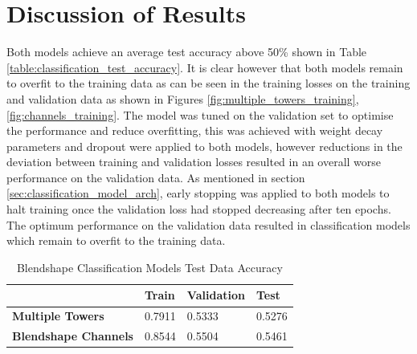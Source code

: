 \section{Discussion of Results}
Both models achieve an average test accuracy above 50\% shown in Table \ref{table:classification_test_accuracy}.
It is clear however that both models remain to overfit to the training data as can be seen in the training losses on the training and validation data as shown in Figures \ref{fig:multiple_towers_training}, \ref{fig:channels_training}.
The model was tuned on the validation set to optimise the performance and reduce overfitting, this was achieved with weight decay parameters and dropout were applied to both models, however reductions in the deviation between training and validation losses resulted in an overall worse performance on the validation data.
As mentioned in section \ref{sec:classification_model_arch}, early stopping was applied to both models to halt training once the validation loss had stopped decreasing after ten epochs.
The optimum performance on the validation data resulted in classification models which remain to overfit to the training data.

\begin{table}[h!]
\centering
    \begin{tabular}{l | l | l | l }
    & \textbf{Train} & \textbf{Validation} & \textbf{Test} \\ \hline
    \textbf{Multiple Towers} & 0.7911 & 0.5333 & 0.5276 \\
    \textbf{Blendshape Channels} & 0.8544 & 0.5504 & 0.5461 \\
    \end{tabular} 
    \caption{Blendshape Classification Models Test Data Accuracy}
\end{table}\label{table:classification_test_accuracy}

